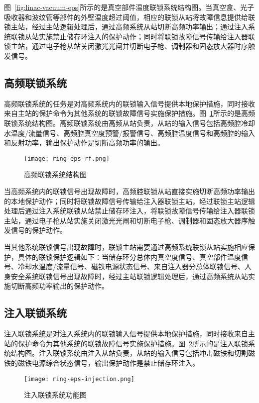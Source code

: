 图~\ref{fig:linac-vacuum-eps}所示的是真空部件温度联锁系统结构图。当真空盒、光子吸收器和波纹管等部件的外壁温度超过阈值，相应的联锁从站将故障信息提供给联锁主站，经过主站逻辑处理后，通过高频系统从站切断高频功率输出；通过注入系统联锁从站实施禁止储存环注入的保护动作；同时将联锁故障信号传输给注入器联锁主站，通过电子枪从站关闭激光光闸并切断电子枪、调制器和固态放大器时序触发信号。

\subsection{高频联锁系统}

高频联锁系统的任务是对高频系统内的联锁输入信号提供本地保护措施，同时接收来自主站的保护命令为其他系统的联锁故障信号实施保护措施。图~\ref{fig:ring-eps-rf}所示的是高频联锁系统结构图。高频联锁系统由高频从站负责，从站的输入信号包括高频腔冷却水温度/流量信号、高频腔真空度预警/报警信号、高频腔温度信号和高频腔的输入和反射功率，输出保护动作是切断高频功率的输出。

\begin{figure}[!htb]
	\centering
	\texttt{[image: ring-eps-rf.png]}
	\caption{高频联锁系统结构图}
	\label{fig:ring-eps-rf}
\end{figure}

当高频系统内的联锁信号出现故障时，高频腔联锁从站直接实施切断高频功率输出的本地保护动作；同时将联锁故障信号传输给注入器联锁主站，经过联锁主站逻辑处理后通过注入系统联锁从站禁止储存环注入，将联锁故障信号传输给注入器联锁主站，通过电子枪从站实施关闭激光光闸和切断电子枪、调制器和固态放大器序触发信号的保护动作。

当其他系统联锁信号出现故障时，联锁主站需要通过高频系统联锁从站实施相应保护，具体的联锁保护逻辑如下：当储存环分总体内真空度信号、真空部件温度信号、冷却水温度/流量信号、磁铁电源状态信号、来自注入器分总体联锁信号、人身安全系统联锁信号出现故障时，经过主站联锁逻辑处理后，通过高频系统从站实施切断高频功率输出的保护动作。


\subsection{注入联锁系统}

注入联锁系统是对注入系统内的联锁输入信号提供本地保护措施，同时接收来自主站的保护命令为其他系统的联锁故障信号实施保护措施。图~\ref{fig:ring-eps-injection}所示的是注入联锁系统结构图。注入联锁系统由注入从站负责，从站的输入信号包括冲击磁铁和切割磁铁的磁铁电源综合状态信号，输出保护动作是禁止储存环注入。

\begin{figure}[!htb]
	\centering
	\texttt{[image: ring-eps-injection.png]}
	\caption{注入联锁系统功能图}
	\label{fig:ring-eps-injection}
\end{figure}

